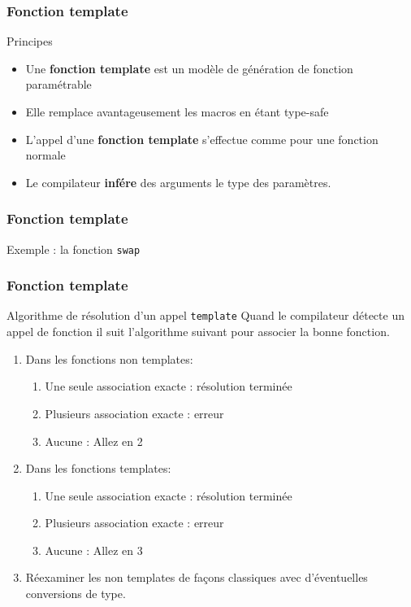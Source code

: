 \documentclass[svgnames]{beamer}
\begin{document}
\frame
{
  \frametitle{Fonction template}
  \begin{block}{Principes}
  \begin{itemize}
  \footnotesize
  \item Une \textbf{fonction template} est un modèle de génération de fonction paramétrable
  \item Elle remplace avantageusement les macros en étant type-safe
  \vspace{0.5cm}
  \lsttmpfunction
  \item L'appel d'une \textbf{fonction template} s'effectue comme pour une fonction normale
  \item Le compilateur \textbf{infére} des arguments le type des paramètres.
  \vspace{0.5cm}
  \lsttmpfunctioncall
  \end{itemize}
  \end{block}
}

\frame
{
  \frametitle{Fonction template}
  \begin{block}{Exemple : la fonction \texttt{swap}}
  \end{block}
}


\frame
{
  \frametitle{Fonction template}
  \begin{block}{Algorithme de résolution d'un appel \texttt{template}}
  \footnotesize Quand le compilateur détecte un appel de fonction il suit l'algorithme suivant pour associer la bonne fonction.
  \begin{enumerate}
  \footnotesize 
  \item Dans les fonctions non templates:
  \begin{enumerate}
  \footnotesize 
  \item Une seule association exacte : \alert{résolution terminée}
  \item Plusieurs association exacte : \alert{erreur}
  \item Aucune : \alert{Allez en 2}
  \end{enumerate}
  \item Dans les fonctions templates:
  \begin{enumerate}
  \footnotesize 
  \item Une seule association exacte : \alert{résolution terminée}
  \item Plusieurs association exacte : \alert{erreur}
  \item Aucune : \alert{Allez en 3}
  \end{enumerate}
  \item Réexaminer les non templates de façons classiques avec d'éventuelles conversions de type.
 \end{enumerate}
 \end{block}
}
\end{document}
